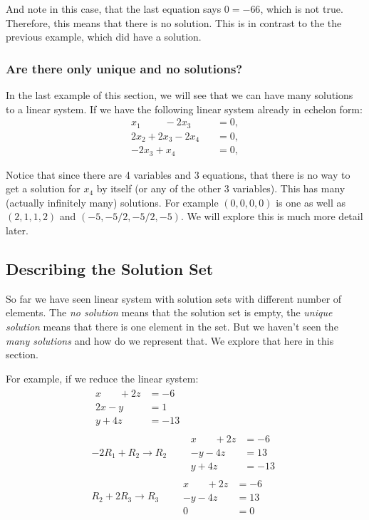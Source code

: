 And note in this case, that the last equation says $0=-66$, which is not true.  Therefore, this means that there is no solution.  This is in contrast to the the previous example, which did have a solution.


\subsubsection{Are there only unique and no solutions?}

In the last example of this section, we will see that we can have many solutions to a linear system.  If we have the following linear system already in echelon form:
%
\begin{align*}
x_1\phantom{+2x2} -2x_3\phantom{+x_4} & = 0, \\
2x_2 +2x_3 -2x_4 & = 0, \\
-2x_3 + x_4 & = 0,
\end{align*}

Notice that since there are 4 variables and 3 equations, that there is no way to get a solution for $x_4$ by itself (or any of the other 3 variables).  This has many (actually infinitely many) solutions.  For example $(0,0,0,0)$ is one as well as $(2,1,1,2)$ and $(-5,-5/2,-5/2,-5)$.  We will explore this is much more detail later.

\subsection{Describing the Solution Set}

So far we have seen linear system with solution sets with different number of elements.  The \emph{no solution} means that the solution set is empty, the \emph{unique solution} means that there is one element in the set.  But we haven't seen the \emph{many solutions} and how do we represent that.  We explore that here in this section.

For example, if we reduce the linear system: \label{ex:many:solutions}
%
\begin{align*}
\begin{split}
x\phantom{+2y} + 2z & = -6 \\
2x-y\phantom{+3z}& = 1 \\
y+4z& = -13
\end{split} \\[12pt]
-2R_1+R_2 \rightarrow R_2 \qquad
\begin{split}
x\phantom{+2y} + 2z & = -6 \\
-y-4z& = 13 \\
y+4z& = -13
\end{split} \\[12pt]
R_2 + 2R_3 \rightarrow R_3 \qquad
\begin{split}
x\phantom{+2y} + 2z & = -6 \\
-y -4z & = 13 \\
0 & = 0
\end{split} \\[12pt]
\end{align*}

